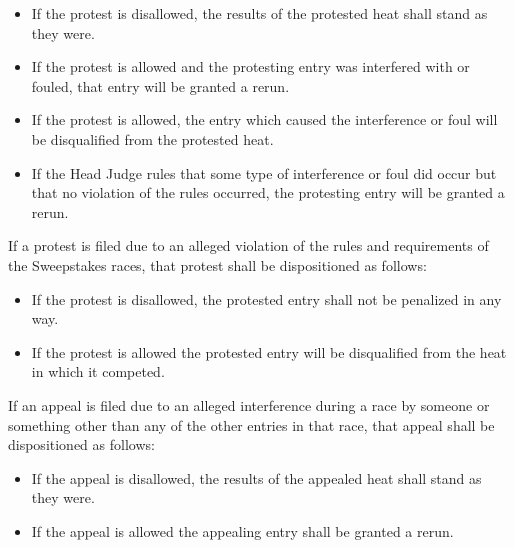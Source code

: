 	\begin{itemize}

		\item
		If the protest is disallowed, the results of the protested heat shall stand as
		they were.

		\item
		If the protest is allowed and the protesting entry was interfered with or
		fouled, that entry will be granted a rerun.

		\item
		If the protest is allowed, the entry which caused the interference or foul will
		be disqualified from the protested heat.

		\item
		If the Head Judge rules that some type of interference or foul did occur but
		that no violation of the rules occurred, the protesting entry will be granted a
		rerun.

	\end{itemize}

	\noindent If a protest is filed due to an alleged violation of the rules and requirements
	of the Sweepstakes races, that protest shall be dispositioned as follows:

	\begin{itemize}

		\item
		If the protest is disallowed, the protested entry shall not be penalized in any
		way.

		\item
		If the protest is allowed the protested entry will be disqualified from the
		heat in which it competed.

	\end{itemize}

	\noindent If an appeal is filed due to an alleged interference during a race by someone
	or something other than any of the other entries in that race, that appeal
	shall be dispositioned as follows:

	\begin{itemize}

		\item
		If the appeal is disallowed, the results of the appealed heat shall stand as
		they were.

		\item
		If the appeal is allowed the appealing entry shall be granted a rerun.

	\end{itemize}	
	

